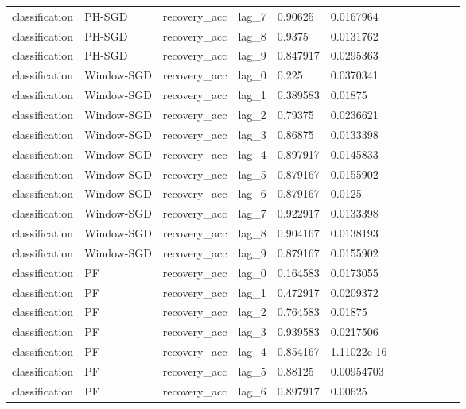 \begin{tabular}{llllllllllll}
classification & PH-SGD & recovery\_acc & lag\_7 & 0.90625 & 0.0167964 &  &  &  &  &  &  \\
classification & PH-SGD & recovery\_acc & lag\_8 & 0.9375 & 0.0131762 &  &  &  &  &  &  \\
classification & PH-SGD & recovery\_acc & lag\_9 & 0.847917 & 0.0295363 &  &  &  &  &  &  \\
classification & Window-SGD & recovery\_acc & lag\_0 & 0.225 & 0.0370341 &  &  &  &  &  &  \\
classification & Window-SGD & recovery\_acc & lag\_1 & 0.389583 & 0.01875 &  &  &  &  &  &  \\
classification & Window-SGD & recovery\_acc & lag\_2 & 0.79375 & 0.0236621 &  &  &  &  &  &  \\
classification & Window-SGD & recovery\_acc & lag\_3 & 0.86875 & 0.0133398 &  &  &  &  &  &  \\
classification & Window-SGD & recovery\_acc & lag\_4 & 0.897917 & 0.0145833 &  &  &  &  &  &  \\
classification & Window-SGD & recovery\_acc & lag\_5 & 0.879167 & 0.0155902 &  &  &  &  &  &  \\
classification & Window-SGD & recovery\_acc & lag\_6 & 0.879167 & 0.0125 &  &  &  &  &  &  \\
classification & Window-SGD & recovery\_acc & lag\_7 & 0.922917 & 0.0133398 &  &  &  &  &  &  \\
classification & Window-SGD & recovery\_acc & lag\_8 & 0.904167 & 0.0138193 &  &  &  &  &  &  \\
classification & Window-SGD & recovery\_acc & lag\_9 & 0.879167 & 0.0155902 &  &  &  &  &  &  \\
classification & PF & recovery\_acc & lag\_0 & 0.164583 & 0.0173055 &  &  &  &  &  &  \\
classification & PF & recovery\_acc & lag\_1 & 0.472917 & 0.0209372 &  &  &  &  &  &  \\
classification & PF & recovery\_acc & lag\_2 & 0.764583 & 0.01875 &  &  &  &  &  &  \\
classification & PF & recovery\_acc & lag\_3 & 0.939583 & 0.0217506 &  &  &  &  &  &  \\
classification & PF & recovery\_acc & lag\_4 & 0.854167 & 1.11022e-16 &  &  &  &  &  &  \\
classification & PF & recovery\_acc & lag\_5 & 0.88125 & 0.00954703 &  &  &  &  &  &  \\
classification & PF & recovery\_acc & lag\_6 & 0.897917 & 0.00625 &  &  &  &  &  &  \\

\end{tabular}
